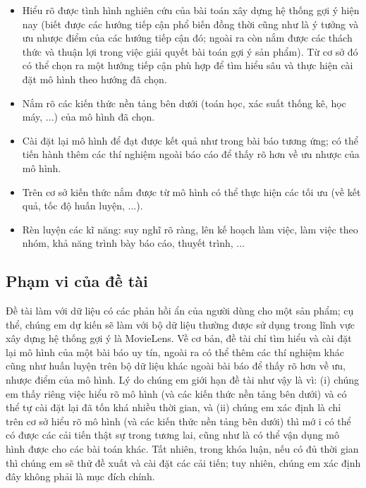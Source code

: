 \documentclass{article}[14pt]
\begin{document}
{    %
\begin{itemize}
\item     Hiểu rõ được tình hình nghiên cứu của bài toán xây dựng hệ thống gợi ý
 hiện nay (biết được các hướng tiếp cận phổ biến đồng thời cũng như là ý tưởng 
 và ưu nhược điểm của các hướng tiếp cận đó; ngoài ra còn nắm được các 
 thách thức và thuận lợi trong việc giải quyết bài toán gợi ý sản phẩm). Từ cơ 
 sở đó có thể chọn ra một hướng tiếp cận phù hợp để tìm hiểu sâu và thực hiện 
 cài đặt mô hình theo hướng đã chọn.
\item      Nắm rõ các kiến thức nền tảng bên dưới (toán học, xác suất thống kê, 
học máy, ...) của mô hình đã chọn.
\item     Cài đặt lại mô hình  để đạt được kết quả như trong bài báo tương ứng; 
có thể tiến hành thêm các thí nghiệm ngoài báo cáo để thấy rõ hơn về ưu nhược 
của mô hình.
\item     Trên cơ sở kiến thức nắm được từ mô hình có thể thực hiện các tối ưu 
(về kết quả, tốc độ huấn luyện, ...).
\item     Rèn luyện các kĩ năng: suy nghĩ rõ ràng, lên kế hoạch làm việc, 
làm việc theo nhóm, khả năng trình bày báo cáo, thuyết trình, ...
\end{itemize}


    
    \subsection{Phạm vi của đề tài}
    
    Đề tài làm với dữ liệu có các phản hồi ẩn của người dùng cho một sản 
phẩm; cụ thể, chúng em dự kiến sẽ làm với bộ dữ liệu thường được sử  
dụng trong lĩnh vực xây dựng  hệ thống gợi ý là MovieLens.
    Về cơ bản, đề tài chỉ tìm hiểu và cài đặt lại mô hình của một bài báo uy 
tín, ngoài ra có thể thêm các thí nghiệm khác cũng như huấn luyện trên 
bộ dữ liệu khác ngoài bài báo để thấy rõ hơn về ưu, nhược điểm của mô 
hình.
    Lý do chúng em giới hạn đề tài như vậy là vì: (i) chúng em thấy riêng 
việc hiểu rõ mô hình (và các kiến thức nền tảng bên dưới) và có thể tự 
cài đặt lại đã tốn khá nhiều thời gian, và (ii) chúng em xác định là chỉ 
trên cơ sở hiểu rõ mô hình (và các kiến thức nền tảng bên dưới) thì mớ i 
có thể có được các cải tiến thật sự trong tương lai, cũng như là có thể 
vận dụng mô hình được cho các bài toán khác.
    Tất nhiên, trong khóa luận, nếu có đủ thời gian thì chúng em sẽ thử đề 
xuất và cài đặt các cải tiến; tuy nhiên, chúng em xác định đây không 
phải là mục đích chính.
    
}
\end{document}
